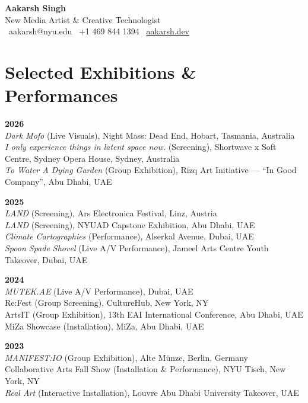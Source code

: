 \documentclass[11pt,a4paper]{article}
\begin{document}
\begin{center}
    {\LARGE\textbf{Aakarsh Singh}}\\[0.3em]
    {\large New Media Artist \& Creative Technologist}\\[0.8em]
    \faEnvelope\ aakarsh@nyu.edu \quad
    \faPhone\ +1 469 844 1394 \quad
    \faGlobe\ \href{https://aakarsh.dev}{aakarsh.dev}
\end{center}

\section*{Selected Exhibitions \& Performances}

\textbf{2026}\\
\textit{Dark Mofo} (Live Visuals), Night Mass: Dead End, Hobart, Tasmania, Australia\\
\textit{I only experience things in latent space now.} (Screening), Shortwave x Soft Centre, Sydney Opera House, Sydney, Australia\\
\textit{To Water A Dying Garden} (Group Exhibition), Rizq Art Initiative --- ``In Good Company'', Abu Dhabi, UAE

\textbf{2025}\\
\textit{LAND} (Screening), Ars Electronica Festival, Linz, Austria\\
\textit{LAND} (Screening), NYUAD Capstone Exhibition, Abu Dhabi, UAE\\
\textit{Climate Cartographies} (Performance), Alserkal Avenue, Dubai, UAE\\
\textit{Spoon Spade Shovel} (Live A/V Performance), Jameel Arts Centre Youth Takeover, Dubai, UAE

\textbf{2024}\\
\textit{MUTEK.AE} (Live A/V Performance), Dubai, UAE\\
Re:Fest (Group Screening), CultureHub, New York, NY\\
ArtsIT (Group Exhibition), 13th EAI International Conference, Abu Dhabi, UAE\\
MiZa Showcase (Installation), MiZa, Abu Dhabi, UAE

\textbf{2023}\\
\textit{MANIFEST:IO} (Group Exhibition), Alte M\"{u}nze, Berlin, Germany\\
Collaborative Arts Fall Show (Installation \& Performance), NYU Tisch, New York, NY\\
\textit{Real Art} (Interactive Installation), Louvre Abu Dhabi University Takeover, UAE
\end{document}
